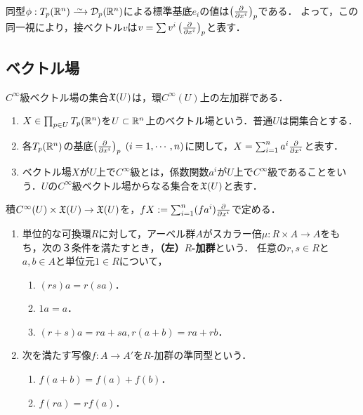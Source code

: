 \documentclass[uplatex,dvipdfmx]{jsreport}
\begin{document}
\begin{notation}
    同型$\phi:T_p(\R^n)\iso\cD_p(\R^n)$による標準基底$e_i$の値は$\left(\frac{\partial }{\partial x^i}\right)_p$である．
    よって，この同一視により，接ベクトル$v$は$v=\sum v^i\left(\frac{\partial }{\partial x^i}\right)_p$と表す．
\end{notation}

\subsection{ベクトル場}

\begin{tcolorbox}[colframe=ForestGreen, colback=ForestGreen!10!white, breakable ,colbacktitle=ForestGreen!40!white, coltitle=black,fonttitle=\bfseries\sffamily,
    title=]
    $C^\infty$級ベクトル場の集合$\mathfrak{X}(U)$は，環$C^\infty(U)$上の左加群である．
\end{tcolorbox}

\begin{definition}\mbox{}
    \begin{enumerate}
        \item $X\in\prod_{p\in U}T_p(\mathbb{R}^n)$を$U\subset\mathbb{R}^n$上のベクトル場という．普通$U$は開集合とする．
        \item 各$T_p(\mathbb{R}^n)$の基底$\left(\frac{\partial }{\partial x^i}\right)_p\;(i=1,\cdots,n)$に関して，$X=\sum^n_{i=1}a^i\frac{\partial }{\partial x^i}$と表す．
        \item ベクトル場$X$が$U$上で$C^\infty$級とは，係数関数$a^i$が$U$上で$C^\infty$級であることをいう．$U$の$C^\infty$級ベクトル場からなる集合を$\mathfrak{X}(U)$と表す．
    \end{enumerate}
\end{definition}

\begin{definition}[ベクトル場の左外算法]
    積$C^\infty(U)\times\mathfrak{X}(U)\to\mathfrak{X}(U)$を，$fX:=\sum_{i=1}^n(fa^i)\frac{\partial }{\partial x^i}$で定める．
\end{definition}

\begin{definition}[module]\mbox{}
    \begin{enumerate}
        \item 単位的な可換環$R$に対して，アーベル群$A$がスカラー倍$\mu:R\times A\to A$をもち，次の３条件を満たすとき，\textbf{（左）$R$-加群}という．
        任意の$r,s\in R$と$a,b\in A$と単位元$1\in R$について，
        \begin{enumerate}
            \item $(rs)a=r(sa)$．
            \item $1a=a$．
            \item $(r+s)a=ra+sa,r(a+b)=ra+rb$．
        \end{enumerate}
        \item 次を満たす写像$f:A\to A'$を$R$-加群の準同型という．
        \begin{enumerate}
            \item $f(a+b)=f(a)+f(b)$．
            \item $f(ra)=rf(a)$．
        \end{enumerate}
    \end{enumerate}
\end{definition}
\end{document}
